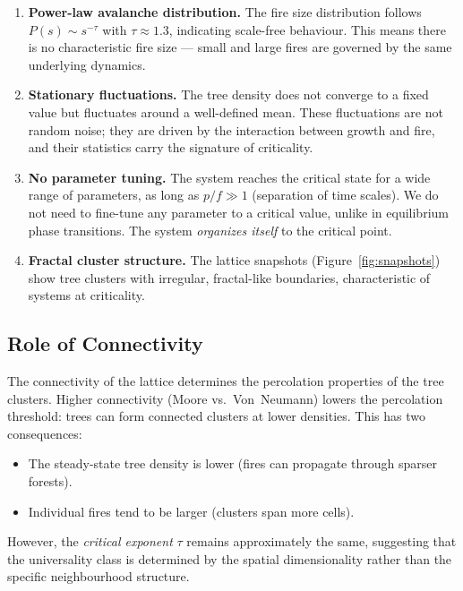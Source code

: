 \documentclass[12pt, a4paper, twocolumn]{article}
\begin{document}
\begin{enumerate}[leftmargin=*]
    \item \textbf{Power-law avalanche distribution.}
    The fire size distribution follows $P(s) \sim s^{-\tau}$ with $\tau \approx 1.3$, indicating scale-free behaviour.
    This means there is no characteristic fire size --- small and large fires are governed by the same underlying dynamics.

    \item \textbf{Stationary fluctuations.}
    The tree density does not converge to a fixed value but fluctuates around a well-defined mean.
    These fluctuations are not random noise; they are driven by the interaction between growth and fire, and their statistics carry the signature of criticality.

    \item \textbf{No parameter tuning.}
    The system reaches the critical state for a wide range of parameters, as long as $p/f \gg 1$ (separation of time scales).
    We do not need to fine-tune any parameter to a critical value, unlike in equilibrium phase transitions.
    The system \textit{organizes itself} to the critical point.

    \item \textbf{Fractal cluster structure.}
    The lattice snapshots (Figure~\ref{fig:snapshots}) show tree clusters with irregular, fractal-like boundaries, characteristic of systems at criticality.
\end{enumerate}

\subsection{Role of Connectivity}

The connectivity of the lattice determines the percolation properties of the tree clusters.
Higher connectivity (Moore vs.\ Von~Neumann) lowers the percolation threshold: trees can form connected clusters at lower densities.
This has two consequences:
\begin{itemize}[leftmargin=*]
    \item The steady-state tree density is lower (fires can propagate through sparser forests).
    \item Individual fires tend to be larger (clusters span more cells).
\end{itemize}
However, the \textit{critical exponent} $\tau$ remains approximately the same, suggesting that the universality class is determined by the spatial dimensionality rather than the specific neighbourhood structure.
\end{document}
